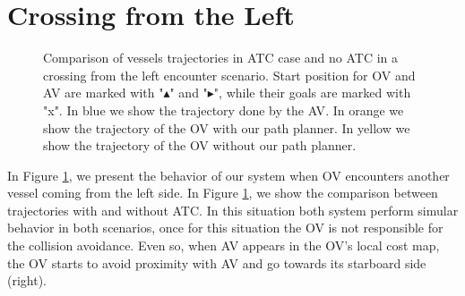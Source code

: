         
         
        
        \section{Crossing from the Left}
        
        \begin{figure}[H]
            \centering
            
            \caption{Comparison of vessels trajectories in \ac{ATC} case and no \ac{ATC} in a crossing from the left encounter scenario. Start position for \ac{OV} and \ac{AV} are marked with "$\blacktriangle$" and "$\blacktriangleright$", while their goals are marked with "x". In blue we show the trajectory done by the \ac{AV}. In orange we show the trajectory of the \ac{OV} with our path planner. In yellow we show the trajectory of the \ac{OV} without our path planner.}
            \label{fig:plot_cl_w_vs_wo}
        \end{figure}
        
        In Figure \ref{fig:plot_cl_w_vs_wo}, we present the behavior of our system when \ac{OV} encounters another vessel coming from the left side. In Figure \ref{fig:plot_cl_w_vs_wo}, we show the comparison between trajectories with and without \ac{ATC}. In this situation both system perform simular behavior in both scenarios, once for this situation the \ac{OV} is not responsible for the collision avoidance. Even so, when \ac{AV} appears in the \ac{OV}'s local cost map, the \ac{OV} starts to avoid proximity with \ac{AV} and go towards its starboard side (right). 
        
